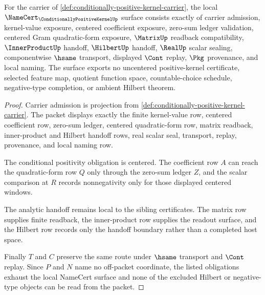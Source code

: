 \begin{theorem}
\label{thm:conditionally-positive-kernel-namecert-obligations}
For the carrier of \autoref{def:conditionally-positive-kernel-carrier}, the local $\NameCert_{\ConditionallyPositiveKernelUp}$ surface consists exactly of carrier admission, kernel-value exposure, centered coefficient exposure, zero-sum ledger validation, centered Gram quadratic-form exposure, $\MatrixUp$ readback compatibility, $\InnerProductUp$ handoff, $\HilbertUp$ handoff, $\RealUp$ scalar sealing, componentwise $\hsame$ transport, displayed $\Cont$ replay, $\Pkg$ provenance, and local naming. The surface exports no uncentered positive-kernel certificate, selected feature map, quotient function space, countable-choice schedule, negative-type completion, or ambient Hilbert theorem.
\end{theorem}
\begin{proof}
Carrier admission is projection from \autoref{def:conditionally-positive-kernel-carrier}. The packet displays exactly the finite kernel-value row, centered coefficient row, zero-sum ledger, centered quadratic-form row, matrix readback, inner-product and Hilbert handoff rows, real scalar seal, transport, replay, provenance, and local naming row.

The conditional positivity obligation is centered. The coefficient row $A$ can reach the quadratic-form row $Q$ only through the zero-sum ledger $Z$, and the scalar comparison at $R$ records nonnegativity only for those displayed centered windows.

The analytic handoff remains local to the sibling certificates. The matrix row supplies finite readback, the inner-product row supplies the readout surface, and the Hilbert row records only the handoff boundary rather than a completed host space.

Finally $T$ and $C$ preserve the same route under $\hsame$ transport and $\Cont$ replay. Since $P$ and $N$ name no off-packet coordinate, the listed obligations exhaust the local NameCert surface and none of the excluded Hilbert or negative-type objects can be read from the packet.
\end{proof}


